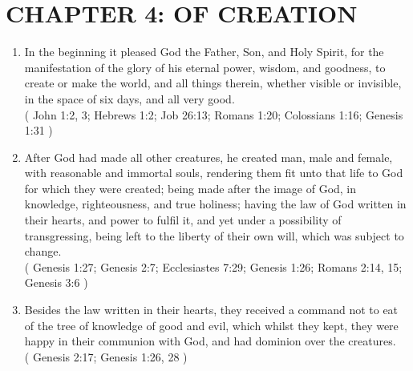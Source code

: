 \documentclass[12pt,a4paper]{book}
\begin{document}
\chapter{CHAPTER 4: OF CREATION}
\label{ch-crea}
\begin{enumerate}
\item In the beginning it pleased God the Father, Son, and Holy Spirit, for the manifestation of the glory of his eternal power, wisdom, and goodness, to create or make the world, and all things therein, whether visible or invisible, in the space of six days, and all very good.\\
( John 1:2, 3; Hebrews 1:2; Job 26:13; Romans 1:20; Colossians 1:16; Genesis 1:31 )
\item After God had made all other creatures, he created man, male and female, with reasonable and immortal souls, rendering them fit unto that life to God for which they were created; being made after the image of God, in knowledge, righteousness, and true holiness; having the law of God written in their hearts, and power to fulfil it, and yet under a possibility of transgressing, being left to the liberty of their own will, which was subject to change.\\
( Genesis 1:27; Genesis 2:7; Ecclesiastes 7:29; Genesis 1:26; Romans 2:14, 15; Genesis 3:6 )
\item Besides the law written in their hearts, they received a command not to eat of the tree of knowledge of good and evil, which whilst they kept, they were happy in their communion with God, and had dominion over the creatures.\\
( Genesis 2:17; Genesis 1:26, 28 )
\end{enumerate}
\end{document}
